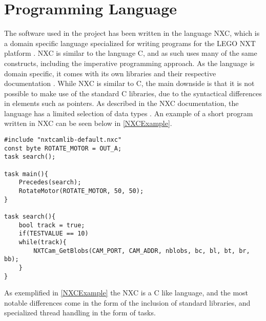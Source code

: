 \section{Programming Language}
The software used in the \name project has been written in the language NXC,
which is a domain specific language specialized for writing programs for the
LEGO NXT platform \cite{NXCIntro}. NXC is similar to the language C, and as such
uses many of the same constructs, including the imperative programming approach. As the
language is domain specific, it comes with its own libraries and their
respective documentation \cite{NXCIntro}. While NXC is similar to C, the main
downside is that it is not possible to make use of the standard C libraries, due
to the syntactical differences in elements such as pointers. As described in the NXC documentation,
the language has a limited selection of data types \cite{NXCVariables}. An
example of a short program written in NXC can be seen below in
\autoref{NXCExample}.\nl

\begin{minipage}[H]{\linewidth}
\begin{lstlisting}[caption = Exaple of a program written in the NXC language, label = NXCExample] 
#include "nxtcamlib-default.nxc"
const byte ROTATE_MOTOR = OUT_A;
task search();

task main(){
    Precedes(search);
    RotateMotor(ROTATE_MOTOR, 50, 50);
}

task search(){
	bool track = true;
	if(TESTVALUE == 10)
	while(track){
        NXTCam_GetBlobs(CAM_PORT, CAM_ADDR, nblobs, bc, bl, bt, br, bb);
	}
}
\end{lstlisting}
\end{minipage}

As exemplified in \autoref{NXCExample} the NXC is a C like language, and
the most notable differences come in the form of the inclusion of standard
libraries, and specialized thread handling in the form of tasks.
